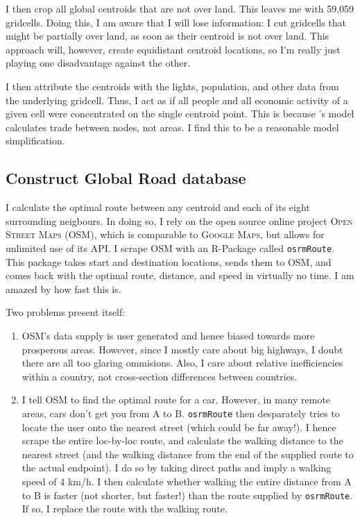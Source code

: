 \documentclass[11pt, oneside]{article}   	%
\begin{document}
I then crop all global centroids that are not over land. This leaves me with 59,059 gridcells. Doing this, I am aware that I will lose information: I cut gridcells that might be partially over land, as soon as their centroid is not over land. This approach will, however, create equidistant centroid locations, so I'm really just playing one disadvantage against the other.

I then attribute the centroids with the lights, population, and other data from the underlying gridcell. Thus, I act as if all people and all economic activity of a given cell were concentrated on the single centroid point. This is because \citeauthor{fajgelbaum_optimal_2017}'s model calculates trade between nodes, not areas. I find this to be a reasonable model simplification.

\subsection{Construct Global Road database}
I calculate the optimal route between any centroid and each of its eight surrounding neigbours. In doing so, I rely on the open source online project \textsc{Open Street Maps} (OSM), which is comparable to \textsc{Google Maps}, but allows for unlimited use of its API. I scrape OSM with an R-Package called \texttt{osrmRoute}. This package takes start and destination locations, sends them to OSM, and comes back with the optimal route, distance, and speed in virtually no time. I am amazed by how fast this is.

Two problems present itself:
\begin{enumerate}
  \item OSM's data supply is user generated and hence biased towards more prosperous areas. However, since I mostly care about big highways, I doubt there are all too glaring ommisions. Also, I care about relative inefficiencies within a country, not cross-section differences between countries.
  \item I tell OSM to find the optimal route for a car. However, in many remote areas, cars don't get you from A to B. \texttt{osrmRoute} then desparately tries to locate the user onto the nearest street (which could be far away!). I hence scrape the entire loc-by-loc route, and calculate the walking distance to the nearest street (and the walking distance from the end of the supplied route to the actual endpoint). I do so by taking direct paths and imply a walking speed of 4 km/h. I then calculate whether walking the entire distance from A to B is faster (not shorter, but faster!) than the route supplied by \texttt{osrmRoute}. If so, I replace the route with the walking route.
\end{enumerate}
\end{document}
